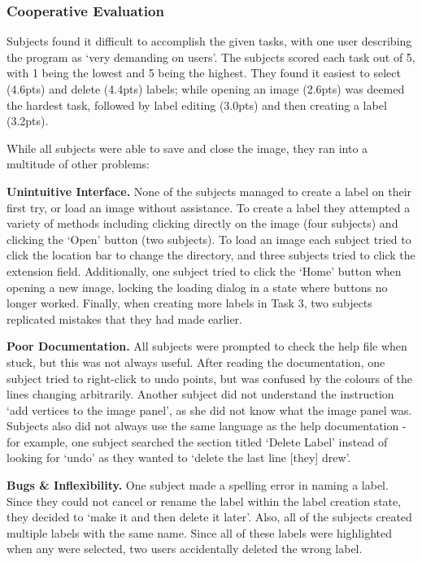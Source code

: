 \documentclass[11pt,twocolumn]{article}
\begin{document}
\subsubsection{Cooperative Evaluation}

Subjects found it difficult to accomplish the given tasks, with one user
describing the program as `very demanding on users'. The subjects scored each
task out of 5, with 1 being the lowest and 5 being the highest. They found it
easiest to select (4.6pts) and delete (4.4pts) labels; while opening an image
(2.6pts) was deemed the hardest task, followed by label editing (3.0pts) and
then creating a label (3.2pts).

While all subjects were able to save and close the image, they ran into a
multitude of other problems:
 
\textbf{Unintuitive Interface.} None of the subjects managed to create a label
on their first try, or load an image without assistance. To create a label they
attempted a variety of methods including clicking directly on the image (four
subjects) and clicking the `Open' button (two subjects). To load an image each
subject tried to click the location bar to change the directory, and three
subjects tried to click the extension field. Additionally, one subject tried to
click the `Home' button when opening a new image, locking the loading dialog in
a state where buttons no longer worked. Finally, when creating more labels in
Task 3, two subjects replicated mistakes that they had made earlier. 

\textbf{Poor Documentation.} All subjects were prompted to check the help file
when stuck, but this was not always useful. After reading the documentation,
one subject tried to right-click to undo points, but was confused by the
colours of the lines changing arbitrarily. Another subject did not understand
the instruction `add vertices to the image panel', as she did not know what the
image panel was. Subjects also did not always use the same language as the help
documentation - for example, one subject searched the section titled `Delete
Label' instead of looking for `undo' as they wanted to `delete the last line
[they] drew'.

\textbf{Bugs \& Inflexibility.} One subject made a spelling error in naming a
label. Since they could not cancel or rename the label within the label
creation state, they decided to `make it and then delete it later'. Also, all
of the subjects created multiple labels with the same name. Since all of these
labels were highlighted when any were selected, two users accidentally deleted
the wrong label.
\end{document}
